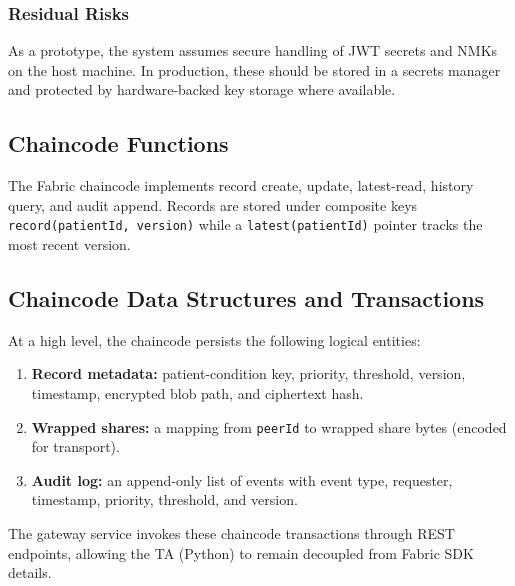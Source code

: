 \documentclass{IEEEtran}
\begin{document}
\subsubsection{Residual Risks}
As a prototype, the system assumes secure handling of JWT secrets and NMKs on the host machine. In production, these should be stored in a secrets manager and protected by hardware-backed key storage where available.

\subsection{Chaincode Functions}
The Fabric chaincode implements record create, update, latest-read, history query, and audit append. Records are stored under composite keys \texttt{record(patientId, version)} while a \texttt{latest(patientId)} pointer tracks the most recent version.

\subsection{Chaincode Data Structures and Transactions}
At a high level, the chaincode persists the following logical entities:
\begin{enumerate}
\item \textbf{Record metadata:} patient-condition key, priority, threshold, version, timestamp, encrypted blob path, and ciphertext hash.
\item \textbf{Wrapped shares:} a mapping from \texttt{peerId} to wrapped share bytes (encoded for transport).
\item \textbf{Audit log:} an append-only list of events with event type, requester, timestamp, priority, threshold, and version.
\end{enumerate}
The gateway service invokes these chaincode transactions through REST endpoints, allowing the TA (Python) to remain decoupled from Fabric SDK details.
\end{document}
